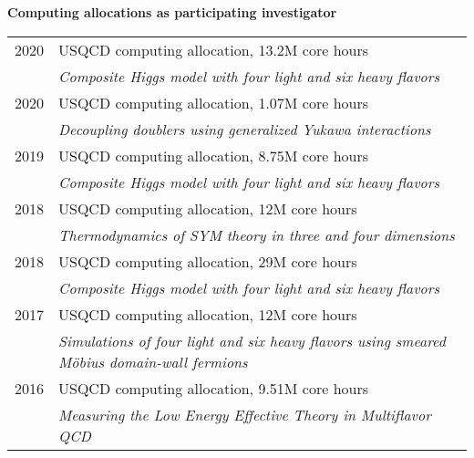 \begin{spacelist}
  \vspace{18 pt}
  \item {\large \bfseries Computing allocations as participating investigator} \\[10 pt]
    \begin{tabular}[t]{cl}
      2020 & USQCD computing allocation, 13.2M core hours                                                         \\ %
           & \textit{Composite Higgs model with four light and six heavy flavors}                                 \\[6 pt]
      2020 & USQCD computing allocation, 1.07M core hours                                                         \\ %
           & \textit{Decoupling doublers using generalized Yukawa interactions}                                   \\[6 pt]
      2019 & USQCD computing allocation, 8.75M core hours                                                         \\ %
           & \textit{Composite Higgs model with four light and six heavy flavors}                                 \\[6 pt]
      2018 & USQCD computing allocation, 12M core hours                                                           \\ %
           & \textit{Thermodynamics of SYM theory in three and four dimensions}                                   \\[6 pt]
      2018 & USQCD computing allocation, 29M core hours                                                           \\ %
           & \textit{Composite Higgs model with four light and six heavy flavors}                                 \\[6 pt]
      2017 & USQCD computing allocation, 12M core hours                                                           \\ %
           & \textit{Simulations of four light and six heavy flavors using smeared M\"obius domain-wall fermions} \\[6 pt]
      2016 & USQCD computing allocation, 9.51M core hours                                                         \\ %
           & \textit{Measuring the Low Energy Effective Theory in Multiflavor QCD}                                \\[6 pt]

\end{tabular}
\end{spacelist}
